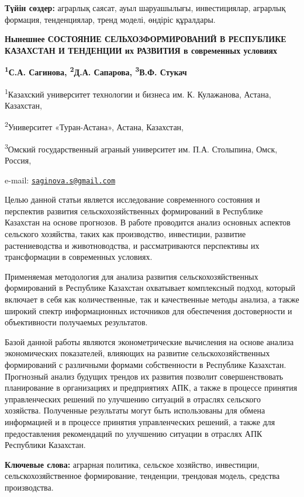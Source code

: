 {\bfseries Түйін сөздер:} аграрлық саясат, ауыл шаруашылығы, инвестициялар,
аграрлық формация, тенденциялар, тренд моделі, өндіріс құралдары.

{\bfseries Нынешнее СОСТОЯНИЕ СЕЛЬХОЗФОРМИРОВАНИЙ В РЕСПУБЛИКЕ КАЗАХСТАН И
ТЕНДЕНЦИИ их РАЗВИТИЯ в современных условиях}

{\bfseries \textsuperscript{1}С.А. Сагинова\textsuperscript{\envelope },
\textsuperscript{2}Д.А. Сапарова, \textsuperscript{3}В.Ф. Стукач}

\textsuperscript{1}Казахский университет технологии и бизнеса им. К.
Кулажанова, Астана, Казахстан,

\textsuperscript{2}Университет «Туран-Астана», Астана, Казахстан,

\textsuperscript{3}Омский государственный аграный университет им. П.А.
Столыпина, Омск, Россия,

e-mail:
\href{mailto:saginova.s@gmail.com}{\nolinkurl{saginova.s@gmail.com}}

Целью данной статьи является исследование современного состояния и
перспектив развития сельскохозяйственных формирований в Республике
Казахстан на основе прогнозов. В работе проводится анализ основных
аспектов сельского хозяйства, таких как производство, инвестиции,
развитие растениеводства и животноводства, и рассматриваются перспективы
их трансформации в современных условиях.

Применяемая методология для анализа развития сельскохозяйственных
формирований в Республике Казахстан охватывает комплексный подход,
который включает в себя как количественные, так и качественные методы
анализа, а также широкий спектр информационных источников для
обеспечения достоверности и объективности получаемых результатов.

Базой данной работы являются эконометрические вычисления на основе
анализа экономических показателей, влияющих на развитие
сельскохозяйственных формирований с различными формами собственности в
Республике Казахстан. Прогнозный анализ будущих трендов их развития
позволит совершенствовать планирование в организациях и предприятиях
АПК, а также в процессе принятия управленческих решений по улучшению
ситуаций в отраслях сельского хозяйства. Полученные результаты могут
быть использованы для обмена информацией и в процессе принятия
управленческих решений, а также для предоставления рекомендаций по
улучшению ситуации в отраслях АПК Республики Казахстан.

{\bfseries Ключевые слова:} аграрная политика, сельское хозяйство,
инвестиции, сельскохозяйственное формирование, тенденции, трендовая
модель, средства производства.


